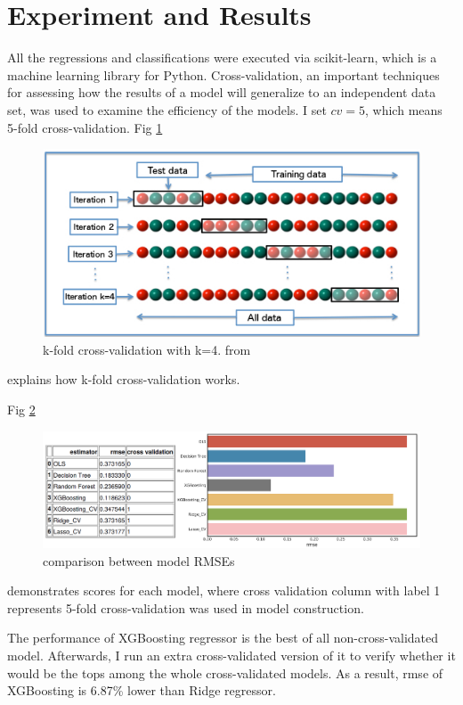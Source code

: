 \documentclass[11pt, a4paper, leqno]{article}
\begin{document}
\section{Experiment and Results}
All the regressions and classifications were  executed via scikit-learn, which is a machine learning library for Python. Cross-validation, an important techniques for assessing how the results of a model will generalize to an independent data set, was used to examine the efficiency of the models. I set $cv=5$, which means 5-fold cross-validation. Fig \ref{fig:k-fold cross-validation}
\begin{figure}[ht]
\centering
\includegraphics[width=0.7\columnwidth]{formulas/K-fold_cross_validation.jpg}
\caption{k-fold cross-validation with k=4. from \cite{Fabian:2016:Online}}
\label{fig:k-fold cross-validation}
\end{figure}
explains how k-fold cross-validation works.

Fig \ref{fig:rmse}
\begin{figure}[ht]
\centering
\includegraphics[width=0.9\columnwidth]{formulas/rmse.png}
\caption{comparison between model RMSEs}
\label{fig:rmse}
\end{figure}
demonstrates scores for each model, where cross validation column with label 1 represents 5-fold cross-validation was used in model construction.

The performance of XGBoosting regressor is the best of all non-cross-validated model. Afterwards, I run an extra cross-validated version of it to verify whether it would be the tops among the whole cross-validated models. As a result, rmse of XGBoosting is 6.87\% lower than Ridge regressor.
\end{document}
